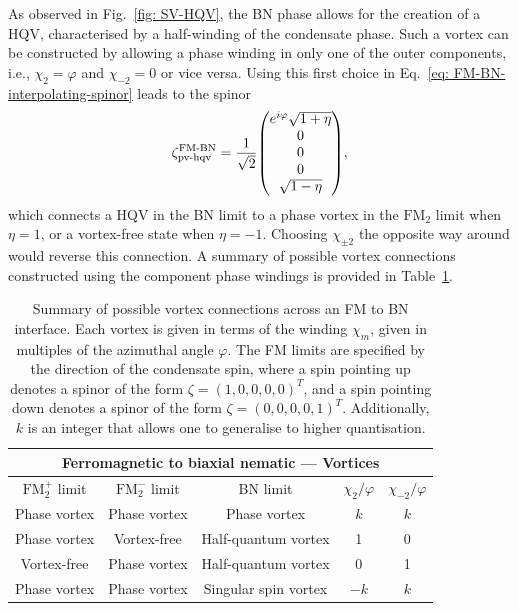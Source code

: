 As observed in Fig.~\ref{fig: SV-HQV}, the BN phase allows for the creation
of a HQV, characterised by a half-winding of the condensate phase.
Such a vortex can be constructed by allowing a phase winding in only one of the
outer components, i.e., \(\chi_2 = \varphi \) and \(\chi_{-2} = 0\) or vice
versa.
Using this first choice in Eq.~\eqref{eq: FM-BN-interpolating-spinor} leads to
the spinor
\begin{align}\label{eq: FM-BN-pv-hqv}
    \zeta^\text{FM-BN}_\text{pv-hqv} = \frac{1}{\sqrt{2}}\mqty(
    e^{i\varphi} \sqrt{1 + \eta} \\
    0 \\
    0 \\
    0 \\
    \sqrt{1 - \eta}),
\end{align}
which connects a HQV in the BN limit to a phase vortex in the \(\text{FM}_2\)
limit when \(\eta = 1\), or a vortex-free state when \(\eta = -1\).
Choosing \(\chi_{\pm 2}\) the opposite way around would reverse this connection.
A summary of possible vortex connections constructed using the component phase
windings is provided in Table~\ref{tab: FM-BN-vortices}.
\begin{table}
    \centering
    \begin{tabular}{ccccc}
        \toprule
        \multicolumn{5}{c}{Ferromagnetic to biaxial nematic --- Vortices} \\
        \midrule
        \(\text{FM}_2^+\) limit & \(\text{FM}_2^-\) limit & BN limit
            & \(\chi_2/\varphi \) & \(\chi_{-2}/\varphi \)  \\
        \midrule
         Phase vortex & Phase vortex & Phase vortex & \(k\) & \(k\) \\ 
         Phase vortex & Vortex-free & Half-quantum vortex & 1 & 0 \\
         Vortex-free & Phase vortex & Half-quantum vortex & 0 & 1 \\
         Phase vortex & Phase vortex & Singular spin vortex  & \(-k\) & \(k\) \\
        \bottomrule
    \end{tabular}
    \caption[Examples of possible vortex connections across a ferromagnetic
    to biaxial nematic interface]{\label{tab: FM-BN-vortices}
    Summary of possible vortex connections across an FM to BN interface.
    Each vortex is given in terms of the winding \(\chi_m\), given in multiples
    of the azimuthal angle \(\varphi \).
    The FM limits are specified by the direction of the condensate spin, where
    a spin pointing up denotes a spinor of the form
    \(\zeta={(1, 0, 0, 0, 0)}^T\), and a spin pointing down denotes a spinor of
    the form \(\zeta={(0, 0, 0, 0, 1)}^T\).
    Additionally, \(k\) is an integer that allows one to generalise to higher
    quantisation.}
\end{table}

